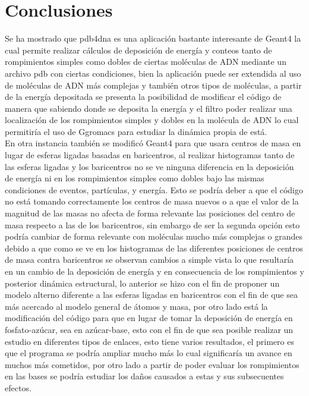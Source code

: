 \clearpage
\section{Conclusiones}
\label{sec:res}
Se ha mostrado que pdb4dna es una aplicación bastante interesante de Geant4 la cual permite realizar cálculos de deposición de energía y conteos tanto de rompimientos simples como dobles de ciertas moléculas de ADN mediante un archivo pdb con ciertas condiciones, bien la aplicación puede ser extendida al uso de moléculas de ADN más complejas y también otros tipos de moléculas, a partir de la energía depositada se presenta la posibilidad de modificar el código de manera que sabiendo donde se deposita la energía y el filtro poder realizar una localización de los rompimientos simples y dobles en la molécula de ADN lo cual permitiría el uso de Ggromacs para estudiar la dinámica propia de está.\\
En otra instancia también se modificó Geant4 para que usara centros de masa en lugar de esferas ligadas basadas en baricentros, al realizar histogramas tanto de las esferas ligadas y los baricentros no se ve ninguna diferencia en la deposición de energía ni en los rompimientos simples como dobles bajo las mismas condiciones de eventos, partículas, y energía. Esto se podría deber a que el código no está tomando correctamente los centros de masa nuevos o a que el valor de la magnitud de las masas no afecta de forma relevante las posiciones del centro de masa respecto a las de los baricentros, sin embargo de ser la segunda opción esto podría cambiar de forma relevante con moléculas mucho más complejas o grandes debido a que como se ve en los histogramas de las diferentes posiciones de centros de masa contra baricentros se observan cambios a simple vista lo que resultaría en un cambio de la deposición de energía y en consecuencia de los rompimientos y posterior dinámica estructural, lo anterior se hizo con el fin de proponer un modelo alterno diferente a las esferas ligadas en baricentros con el fin de que sea más acercado al modelo general de átomos y masa, por otro lado está la modificación del código para que en lugar de tomar la deposición de energía en fosfato-azúcar, sea en azúcar-base, esto con el fin de que sea posible realizar un estudio en diferentes tipos de enlaces, esto tiene varios resultados, el primero es que el programa se podría ampliar mucho más lo cual significaría un avance en muchos más cometidos, por otro lado a partir de poder evaluar los rompimientos en las bases se podría estudiar los daños causados a estas y sus subsecuentes efectos.
